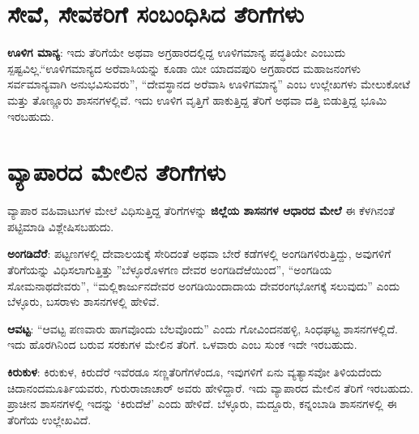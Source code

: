 \section{ಸೇವೆ, ಸೇವಕರಿಗೆ ಸಂಬಂಧಿಸಿದ ತೆರಿಗೆಗಳು}

\textbf{ಊಳಿಗ ಮಾನ್ಯ}: ಇದು ತೆರಿಗೆಯೇ ಅಥವಾ ಅಗ್ರಹಾರದಲ್ಲಿದ್ದ ಊಳಿಗಮಾನ್ಯ ಪದ್ಧತಿಯೇ ಎಂಬುದು ಸ್ಪಷ್ಟವಿಲ್ಲ.\break “ಊಳಿಗಮಾನ್ಯದ ಅರೆವಾಸಿಯನ್ನು ಕೂಡಾ ಯೀ ಯಾದವಪುರಿ ಅಗ್ರಹಾರದ ಮಹಾಜನಂಗಳು ಸರ್ವಮಾನ್ಯವಾಗಿ ಅನುಭವಿಸುವರು”, “ದೇವಸ್ಥಾನದ ಅರೆವಾಸಿ ಊಳಿಗಮಾನ್ಯ” ಎಂಬ ಉಲ್ಲೇಖಗಳು ಮೇಲುಕೋಟೆ ಮತ್ತು ತೊಣ್ಣೂರು ಶಾಸನಗಳಲ್ಲಿವೆ. ಇದು ಊಳಿಗ ವೃತ್ತಿಗೆ ಹಾಕುತ್ತಿದ್ದ ತೆರಿಗೆ ಅಥವಾ ದತ್ತಿ ಬಿಡುತ್ತಿದ್ದ ಭೂಮಿ ಇರಬಹುದು.

\newpage

\section{ವ್ಯಾಪಾರದ ಮೇಲಿನ ತೆರಿಗೆಗಳು}

ವ್ಯಾಪಾರ ವಹಿವಾಟುಗಳ ಮೇಲೆ ವಿಧಿಸುತ್ತಿದ್ದ ತೆರಿಗೆಗಳನ್ನು \textbf{ಜಿಲ್ಲೆಯ ಶಾಸನಗಳ ಆಧಾರದ ಮೇಲೆ} ಈ ಕೆಳಗಿನಂತೆ ಪಟ್ಟಿಮಾಡಿ ವಿಶ್ಲೇಷಿಸಬಹುದು.

\textbf{ಅಂಗಡಿದೆರೆ}: ಪಟ್ಟಣಗಳಲ್ಲಿ ದೇವಾಲಯಕ್ಕೆ ಸೇರಿದಂತೆ ಅಥವಾ ಬೇರೆ ಕಡೆಗಳಲ್ಲಿ ಅಂಗಡಿಗಳಿರುತ್ತಿದ್ದು, ಅವುಗಳಿಗೆ ತೆರಿಗೆಯನ್ನು ವಿಧಿಸಲಾಗುತ್ತಿತ್ತು ”ಬೆಳ್ಳೂರೊಳಗಣ ದೇವರ ಅಂಗಡಿದೆಱೆಯಿಂದ”, “ಅಂಗಡಿಯ ಸೋಮನಾಥದೇವರು”, “ಮಲ್ಲಿಕಾರ್ಜುನದೇವರ ಅಂಗಡಿಯಿಂದಾದಾಯ ದೇವರಂಗಭೋಗಕ್ಕೆ ಸಲುವುದು” ಎಂದು ಬೆಳ್ಳೂರು, ಬಸರಾಳು ಶಾಸನಗಳಲ್ಲಿ ಹೇಳಿವೆ.

\textbf{ಆವಟ್ಟ}: “ಆವಟ್ಟ ಪಣವಾರು ಹಾಗವೊಂದು ಬೆಲವೊಂದು” ಎಂದು ಗೋವಿಂದನಹಳ್ಳಿ, ಸಿಂಧಘಟ್ಟ ಶಾಸನಗಳ\-ಲ್ಲಿದೆ. ಇದು ಹೊರಗಿನಿಂದ ಬರುವ ಸರಕುಗಳ ಮೇಲಿನ ತೆರಿಗೆ. ಒಳವಾರು ಎಂಬ ಸುಂಕ ಇದೇ ಇರಬಹುದು.

\textbf{ಕಿರುಕುಳ}: ಕಿರುಕುಳ, ಕಿರುದೆರೆ ಇವೆರಡೂ ಸಣ್ಣತೆರಿಗೆಗಳೆಂದೂ, ಇವುಗಳಿಗೆ ಏನು ವ್ಯತ್ಯಾಸವೋ ತಿಳಿಯದೆಂದು ಚಿದಾನಂದಮೂರ್ತಿಯವರು, ಗುರುರಾಜಾಚಾರ್​ ಅವರು ಹೇಳಿದ್ದಾರೆ. ಇದು ವ್ಯಾಪಾರದ ಮೇಲಿನ ತೆರಿಗೆ ಇರಬಹುದು. ಪ್ರಾಚೀನ ಶಾಸನಗಳಲ್ಲಿ ಇದನ್ನು ‘ಕಿರುದೆಱೆ’ ಎಂದು ಹೇಳಿದೆ. ಬೆಳ್ಳೂರು, ಮದ್ದೂರು, ಕನ್ನಂಬಾಡಿ ಶಾಸನಗಳಲ್ಲಿ ಈ ತೆರಿಗೆಯ ಉಲ್ಲೇಖವಿದೆ.

